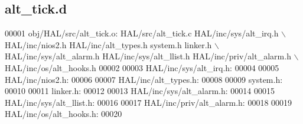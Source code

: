 \subsection{alt\+\_\+tick.\+d}
\label{alt__tick_8d_source}

\begin{DoxyCode}
00001 obj/HAL/src/alt_tick.o: HAL/src/alt_tick.c HAL/inc/sys/alt_irq.h \(\backslash\)
 HAL/inc/nios2.h HAL/inc/alt\_types.h system.h linker.h \(\backslash\)
 HAL/inc/sys/alt_alarm.h HAL/inc/sys/alt_llist.h HAL/inc/priv/alt_alarm.h \(\backslash\)
 HAL/inc/os/alt\_hooks.h
00002 
00003 HAL/inc/sys/alt_irq.h:
00004 
00005 HAL/inc/nios2.h:
00006 
00007 HAL/inc/alt\_types.h:
00008 
00009 system.h:
00010 
00011 linker.h:
00012 
00013 HAL/inc/sys/alt_alarm.h:
00014 
00015 HAL/inc/sys/alt_llist.h:
00016 
00017 HAL/inc/priv/alt_alarm.h:
00018 
00019 HAL/inc/os/alt\_hooks.h:
00020 \end{DoxyCode}
